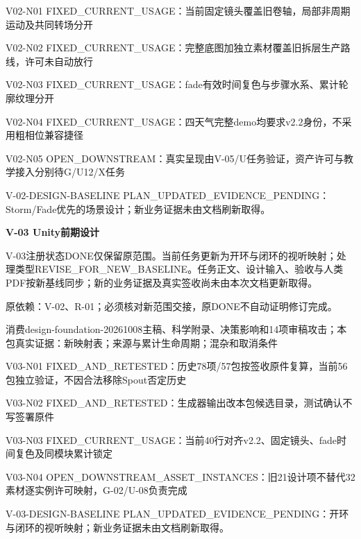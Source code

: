 \documentclass[11pt,a4paper]{article}
\newcommand{\reviewsection}[1]{\par\Needspace{5\baselineskip}\vspace{10pt}\begin{center}{\titlelatin\titlecjk\bfseries\fontsize{14}{20}\selectfont #1}\end{center}}
\begin{document}
V02-\allowbreak{}N01 FIXED\_\allowbreak{}CURRENT\_\allowbreak{}USAGE：当前固定镜头覆盖旧卷轴，局部非周期运动及共同转场分开


V02-\allowbreak{}N02 FIXED\_\allowbreak{}CURRENT\_\allowbreak{}USAGE：完整底图加独立素材覆盖旧拆层生产路线，许可未自动放行


V02-\allowbreak{}N03 FIXED\_\allowbreak{}CURRENT\_\allowbreak{}USAGE：fade有效时间复色与步骤水系、累计轮廓纹理分开


V02-\allowbreak{}N04 FIXED\_\allowbreak{}CURRENT\_\allowbreak{}USAGE：四天气完整demo均要求v2.2身份，不采用粗相位兼容捷径


V02-\allowbreak{}N05 OPEN\_\allowbreak{}DOWNSTREAM：真实呈现由V-\allowbreak{}05/\allowbreak{}U任务验证，资产许可与教学接入分别待G/\allowbreak{}U12/\allowbreak{}X任务


V-\allowbreak{}02-\allowbreak{}DESIGN-\allowbreak{}BASELINE PLAN\_\allowbreak{}UPDATED\_\allowbreak{}EVIDENCE\_\allowbreak{}PENDING：Storm/\allowbreak{}Fade优先的场景设计；新业务证据未由文档刷新取得。


\reviewsection{V-\allowbreak{}03 Unity前期设计}
V-\allowbreak{}03注册状态DONE仅保留原范围。当前任务更新为开环与闭环的视听映射；处理类型REVISE\_\allowbreak{}FOR\_\allowbreak{}NEW\_\allowbreak{}BASELINE。任务正文、设计输入、验收与人类PDF按新基线同步；新的业务证据及真实签收尚未由本次文档更新取得。


原依赖：V-\allowbreak{}02、R-\allowbreak{}01；必须核对新范围交接，原DONE不自动证明修订完成。


消费design-\allowbreak{}foundation-\allowbreak{}20261008主稿、科学附录、决策影响和14项审稿攻击；本包真实证据：新映射表；来源与累计生命周期；混杂和取消条件


V03-\allowbreak{}N01 FIXED\_\allowbreak{}AND\_\allowbreak{}RETESTED：历史78项/\allowbreak{}57包按签收原件复算，当前56包独立验证，不因合法移除Spout否定历史


V03-\allowbreak{}N02 FIXED\_\allowbreak{}AND\_\allowbreak{}RETESTED：生成器输出改本包候选目录，测试确认不写签署原件


V03-\allowbreak{}N03 FIXED\_\allowbreak{}CURRENT\_\allowbreak{}USAGE：当前40行对齐v2.2、固定镜头、fade时间复色及同模块累计锁定


V03-\allowbreak{}N04 OPEN\_\allowbreak{}DOWNSTREAM\_\allowbreak{}ASSET\_\allowbreak{}INSTANCES：旧21设计项不替代32素材逐实例许可映射，G-\allowbreak{}02/\allowbreak{}U-\allowbreak{}08负责完成


V-\allowbreak{}03-\allowbreak{}DESIGN-\allowbreak{}BASELINE PLAN\_\allowbreak{}UPDATED\_\allowbreak{}EVIDENCE\_\allowbreak{}PENDING：开环与闭环的视听映射；新业务证据未由文档刷新取得。
\end{document}
